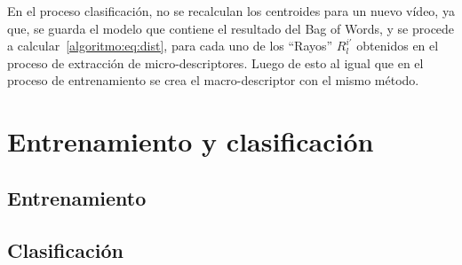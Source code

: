	En el proceso clasificación, no se recalculan los centroides para un nuevo vídeo, ya que, se guarda el modelo que contiene el resultado del Bag of Words, y se procede a calcular~\ref{algoritmo:eq:dist}, para cada uno de los ``Rayos'' $R^{i'}_l$ obtenidos en el proceso de extracción de micro-descriptores. Luego de esto al igual que en el proceso de entrenamiento se crea el macro-descriptor con el mismo método.
	
	
\section{Entrenamiento y clasificación}
\label{sec:clasificacion}

	\subsection{Entrenamiento}
	\label{algoritmo:entrenamiento}
	
	\subsection{Clasificación}
	\label{algoritmo:clasificacion}
	
	
	
	
	
	
	